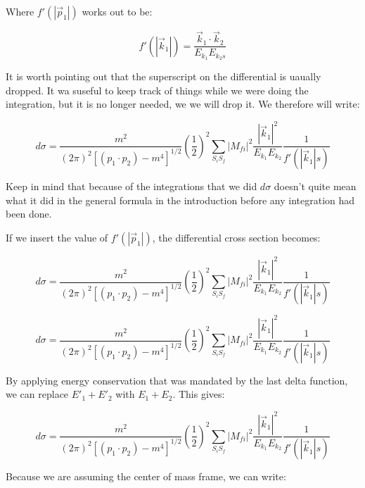 \documentclass[a4]{article}
\begin{document}
    Where $f' (|\vec{p}_1|)$ works out to be:

    \begin{equation}
        f' (|\vec{k}_1|) = \frac{\vec{k}_1 \cdot \vec{k}_2}{E_{k_1} E_{k_2s}}
    \end{equation}

    It is worth pointing out that the superscript on the differential is uaually dropped. It wa suseful to keep track of things while we were doing the integration, but it is no longer needed, we we will drop it. 
    We therefore will write: 

    \begin{equation}
        d \sigma = \frac{m^2}{(2 \pi)^2 [(p_1 \cdot p_2) - m^4]^{1/2}} (\frac{1}{2})^2 \sum_{S_i S_f} |M_{fi}|^2 \frac{|\vec{k}_1|^2}{E_{k_1} E_{k_2}} \frac{1}{f' (|\vec{k}_1|s)}
    \end{equation}

    Keep in mind that because of the integrations that we did $d \sigma$ doesn't quite mean what it did in the general formula in the introduction before any  integration had been done.

    If we insert the value of $f' (|\vec{p}_1|)$, the differential cross section becomes:

    \begin{equation}
        d \sigma = \frac{m^2}{(2 \pi)^2 [(p_1 \cdot p_2) - m^4]^{1/2}} (\frac{1}{2})^2 \sum_{S_i S_f} |M_{fi}|^2 \frac{|\vec{k}_1|^2}{E_{k_1} E_{k_2}} \frac{1}{f' (|\vec{k}_1|s)}
    \end{equation}

    \begin{equation}
        d \sigma = \frac{m^2}{(2 \pi)^2 [(p_1 \cdot p_2) - m^4]^{1/2}} (\frac{1}{2})^2 \sum_{S_i S_f} |M_{fi}|^2 \frac{|\vec{k}_1|^2}{E_{k_1} E_{k_2}} \frac{1}{f' (|\vec{k}_1|s)}
    \end{equation}

    By applying energy conservation that was mandated by the last delta function, we can replace $E'_1 + E'_2$ with $E_1 + E_2$. This gives:

    \begin{equation}
        d \sigma = \frac{m^2}{(2 \pi)^2 [(p_1 \cdot p_2) - m^4]^{1/2}} (\frac{1}{2})^2 \sum_{S_i S_f} |M_{fi}|^2 \frac{|\vec{k}_1|^2}{E_{k_1} E_{k_2}} \frac{1}{f' (|\vec{k}_1|s)}
    \end{equation}

    Because we are assuming the center of mass frame, we can write:
\end{document}
